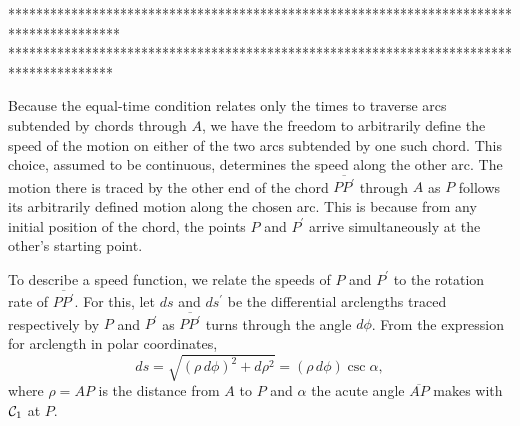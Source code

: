 \documentclass{ximera}
\begin{document}


\iffalse
****************************************************************************************
***************************************************************************************

Because the equal-time condition relates only the times to traverse arcs subtended by chords through $A$, we have the freedom to arbitrarily define the speed of the motion on either of the two arcs subtended by one such chord. This choice, assumed to be continuous, determines the speed along the other arc. The motion there is traced by the other end of the chord $\overline{PP^\prime}$ through $A$ as $P$ follows its arbitrarily defined motion along the chosen arc. This is because from any initial position of the chord, the points $P$ and $P^\prime$ arrive simultaneously at the other's starting point.



To describe a speed function, we relate the speeds of $P$ and $P^\prime$ to the rotation rate of $\overline{PP^\prime}$. For this, let $ds$ and $ds^\prime$ be the differential arclengths  traced respectively by $P$ and $P^\prime$ as $\overline{PP^\prime}$ turns through the angle $d\phi$. From the expression for arclength in polar coordinates,  
\begin{equation}
   ds =  \sqrt{(\rho \, d\phi)^2 + d\rho^2}   =   (\rho \, d\phi) \csc \alpha ,   \label{Eq:ArcLength}
\end{equation}
where $\rho = AP$ is the distance from $A$ to $P$ and $\alpha$ the acute angle $\overline{AP}$ makes with ${\cal C}_1$ at $P$. 
\end{document}
